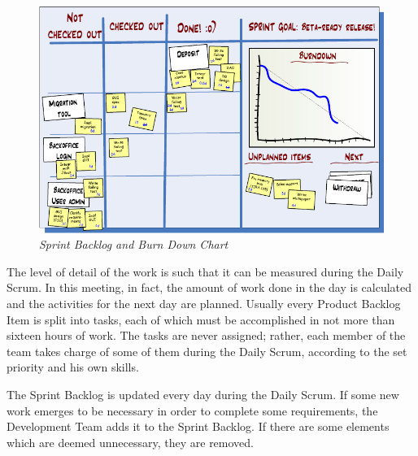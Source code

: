 			\begin{figure}[h]
			  \begin{center} 
			    \includegraphics[scale=0.65]{images/ch_04/task_board_and_chart.png}
			  \end{center} 
			  \caption{\textit{Sprint Backlog and Burn Down Chart}}  
			  \label{fig:SprintBacklog}
		  	\end{figure}

			The level of detail of the work is such that it can be measured during the Daily Scrum. 
			In this meeting, in fact, the amount of work done in the day is calculated and the activities for the next day are planned.
			Usually every Product Backlog Item is split into tasks, each of which must be accomplished in not more than sixteen hours of work. The tasks are never assigned; rather, each member of the team takes charge of some of them during the Daily Scrum, according to the set priority and his own skills.
			
			The Sprint Backlog is updated every day during the Daily Scrum. If some new work emerges to be necessary in order to complete some requirements, the Development Team adds it to the Sprint Backlog. If there are some elements which are deemed unnecessary, they are removed. 
			
